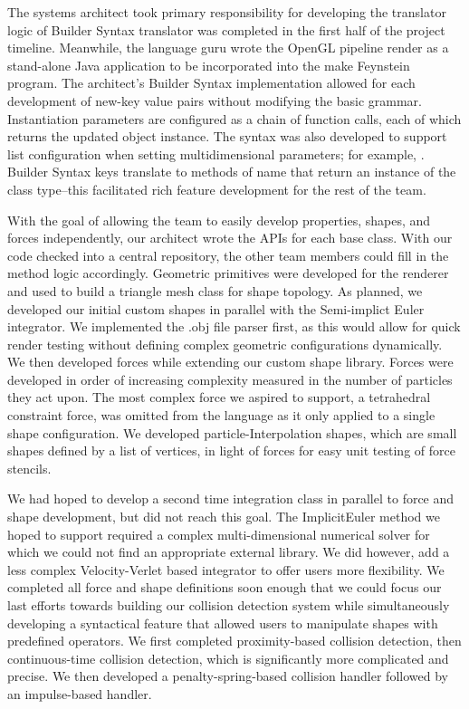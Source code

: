The systems architect took primary responsibility for developing the
translator logic of Builder Syntax translator was completed in the
first half of the project timeline. Meanwhile, the language guru wrote
the OpenGL pipeline render as a stand-alone Java application to be
incorporated into the make Feynstein program. The architect's Builder
Syntax implementation allowed for each development of new-key value
pairs without modifying the basic grammar. Instantiation parameters
are configured as a chain of function calls, each of which returns the
updated object instance. The syntax was also developed to support list
configuration when setting multidimensional parameters; for example,
. Builder Syntax keys
translate to methods of name  that return an
instance of the class type--this facilitated rich feature development
for the rest of the team.

With the goal of allowing the team to easily develop properties,
shapes, and forces independently, our architect wrote the APIs for
each base class. With our code checked into a central repository, the
other team members could fill in the method logic
accordingly. Geometric primitives were developed for the renderer and
used to build a triangle mesh class for shape topology. As planned, we
developed our initial custom shapes in parallel with the Semi-implict
Euler integrator. We implemented the .obj file parser first, as this
would allow for quick render testing without defining complex
geometric configurations dynamically. We then developed forces while
extending our custom shape library. Forces were developed in order of
increasing complexity measured in the number of particles they act
upon. The most complex force we aspired to support, a tetrahedral
constraint force, was omitted from the language as it only applied to
a single shape configuration. We developed particle-Interpolation
shapes, which are small shapes defined by a list of vertices, in light
of forces for easy unit testing of force stencils.

We had hoped to develop a second time integration class in parallel to
force and shape development, but did not reach this goal. The
ImplicitEuler method we hoped to support required a complex
multi-dimensional numerical solver for which we could not find an
appropriate external library. We did however, add a less complex
Velocity-Verlet based integrator to offer users more flexibility. We
completed all force and shape definitions soon enough that we could
focus our last efforts towards building our collision detection system
while simultaneously developing a syntactical feature that allowed
users to manipulate shapes with predefined operators. We first
completed proximity-based collision detection, then continuous-time
collision detection, which is significantly more complicated and
precise. We then developed a penalty-spring-based collision handler
followed by an impulse-based handler.

